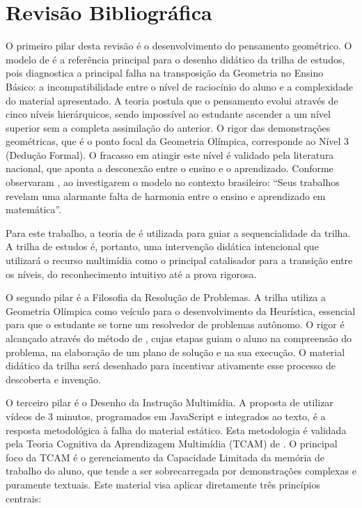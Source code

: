 \section{Revisão Bibliográfica}
O primeiro pilar desta revisão é o desenvolvimento do pensamento geométrico. O modelo de  é a referência principal para o desenho didático da trilha de estudos, pois diagnostica a principal falha na transposição da Geometria no Ensino Básico: a incompatibilidade entre o nível de raciocínio do aluno e a complexidade do material apresentado. A teoria postula que o pensamento evolui através de cinco níveis hierárquicos, sendo impossível ao estudante ascender a um nível superior sem a completa assimilação do anterior. O rigor das demonstrações geométricas, que é o ponto focal da Geometria Olímpica, corresponde ao Nível 3 (Dedução Formal). O fracasso em atingir este nível é validado pela literatura nacional, que aponta a desconexão entre o ensino e o aprendizado. Conforme observaram , ao investigarem o modelo no contexto brasileiro: ``Seus trabalhos revelam uma alarmante falta de harmonia entre o ensino e aprendizado em matemática''.

Para este trabalho, a teoria de  é utilizada para guiar a sequencialidade da trilha. A trilha de estudos é, portanto, uma intervenção didática intencional que utilizará o recurso multimídia como o principal catalisador para a transição entre os níveis, do reconhecimento intuitivo até a prova rigorosa.

O segundo pilar é a Filosofia da Resolução de Problemas. A trilha utiliza a Geometria Olímpica como veículo para o desenvolvimento da Heurística, essencial para que o estudante se torne um resolvedor de problemas autônomo. O rigor é alcançado através do método de , cujas etapas guiam o aluno na compreensão do problema, na elaboração de um plano de solução e na sua execução. O material didático da trilha será desenhado para incentivar ativamente esse processo de descoberta e invenção.

O terceiro pilar é o Desenho da Instrução Multimídia. A proposta de utilizar vídeos de 3 minutos, programados em JavaScript e integrados ao texto, é a resposta metodológica à falha do material estático. Esta metodologia é validada pela Teoria Cognitiva da Aprendizagem Multimídia (TCAM) de . O principal foco da TCAM é o gerenciamento da Capacidade Limitada da memória de trabalho do aluno, que tende a ser sobrecarregada por demonstrações complexas e puramente textuais. Este material visa aplicar diretamente três princípios centrais:

